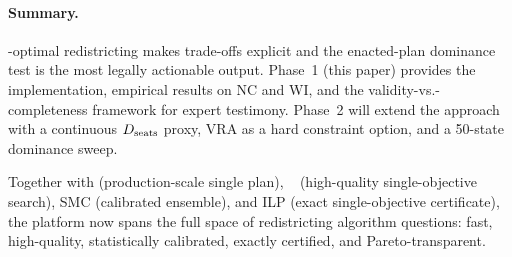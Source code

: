\paragraph{Summary.}
\pareto{}-optimal redistricting makes trade-offs explicit and the enacted-plan
dominance test is the most legally actionable output.
Phase~1 (this paper) provides the \nsga{} implementation, empirical results
on NC and WI, and the validity-vs.-completeness framework for expert testimony.
Phase~2 will extend the approach with a continuous $D_{\mathrm{seats}}$ proxy, VRA
as a hard constraint option, and a 50-state dominance sweep.

Together with \metis{} (production-scale single plan),
\be{}~\citep{dellaLibera2026comparison} (high-quality single-objective search),
SMC (calibrated ensemble), and ILP (exact single-objective certificate),
the platform now spans the full space of redistricting algorithm questions:
fast, high-quality, statistically calibrated, exactly certified,
and Pareto-transparent.
